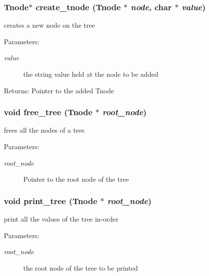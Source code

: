 \subsubsection{\setlength{\rightskip}{0pt plus 5cm}\bf{Tnode}$\ast$ create\_\-tnode (\bf{Tnode} $\ast$ {\em node}, char $\ast$ {\em value})}\label{tnode_8c_da5f86089fe3823ec899b99e631d3c5f}


creates a new node on the tree \begin{Desc}
\item[Parameters:]
\begin{description}
\item[{\em value}]the string value held at the node to be added \end{description}
\end{Desc}
\begin{Desc}
\item[Returns:]Pointer to the added Tnode \end{Desc}
\subsubsection{\setlength{\rightskip}{0pt plus 5cm}void free\_\-tree (\bf{Tnode} $\ast$ {\em root\_\-node})}\label{tnode_8c_672b4a5d276720be5ec4fc3a21c0f5d7}


frees all the nodes of a tree \begin{Desc}
\item[Parameters:]
\begin{description}
\item[{\em root\_\-node}]Pointer to the root node of the tree \end{description}
\end{Desc}
\subsubsection{\setlength{\rightskip}{0pt plus 5cm}void print\_\-tree (\bf{Tnode} $\ast$ {\em root\_\-node})}\label{tnode_8c_3554e5c7749b8d9de1f028016358c454}


print all the values of the tree in-order \begin{Desc}
\item[Parameters:]
\begin{description}
\item[{\em root\_\-node}]the root node of the tree to be printed \end{description}
\end{Desc}
